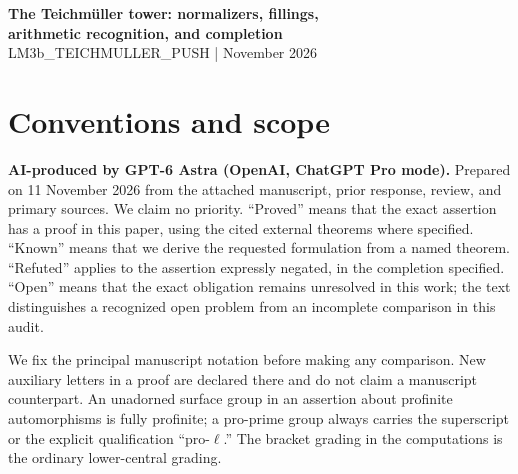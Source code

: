 \documentclass[10pt,a4paper]{article}
\begin{document}
\begin{center}
{\Large\bfseries The Teichm\"uller tower: normalizers, fillings,\\
arithmetic recognition, and completion}\\[5pt]
{\small LM3b\_TEICHMULLER\_PUSH \quad |  November 2026}
\end{center}
\section{Conventions and scope}\label{conventions-and-scope}

\textbf{AI-produced by GPT-6 Astra (OpenAI, ChatGPT Pro mode).} Prepared on 11 November 2026 from the attached manuscript, prior response, review, and primary sources. We claim no priority. ``Proved'' means that the exact assertion has a proof in this paper, using the cited external theorems where specified. ``Known'' means that we derive the requested formulation from a named theorem. ``Refuted'' applies to the assertion expressly negated, in the completion specified. ``Open'' means that the exact obligation remains unresolved in this work; the text distinguishes a recognized open problem from an incomplete comparison in this audit.

We fix the principal manuscript notation before making any comparison. New auxiliary letters in a proof are declared there and do not claim a manuscript counterpart. An unadorned surface group in an assertion about profinite automorphisms is fully profinite; a pro-prime group always carries the superscript or the explicit qualification ``pro-\(\ell\).'' The bracket grading in the computations is the ordinary lower-central grading.
\end{document}
